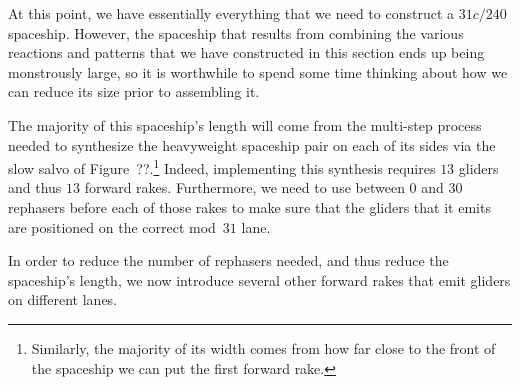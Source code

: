 At this point, we have essentially everything that we need to construct a $31c/240$ spaceship. However, the spaceship that results from combining the various reactions and patterns that we have constructed in this section ends up being monstrously large, so it is worthwhile to spend some time thinking about how we can reduce its size prior to assembling it.

The majority of this spaceship's length will come from the multi-step process needed to synthesize the heavyweight spaceship pair on each of its sides via the slow salvo of Figure~??.\footnote{Similarly, the majority of its width comes from how far close to the front of the spaceship we can put the first forward rake.} Indeed, implementing this synthesis requires $13$ gliders and thus $13$ forward rakes. Furthermore, we need to use between $0$ and $30$ rephasers before each of those rakes to make sure that the gliders that it emits are positioned on the correct mod~$31$ lane.

In order to reduce the number of rephasers needed, and thus reduce the spaceship's length, we now introduce several other forward rakes that emit gliders on different lanes.



%


